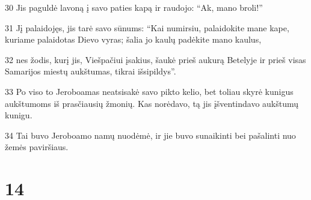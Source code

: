 \par 30 Jis paguldė lavoną į savo paties kapą ir raudojo: “Ak, mano broli!” 
\par 31 Jį palaidojęs, jis tarė savo sūnums: “Kai numirsiu, palaidokite mane kape, kuriame palaidotas Dievo vyras; šalia jo kaulų padėkite mano kaulus, 
\par 32 nes žodis, kurį jis, Viešpačiui įsakius, šaukė prieš aukurą Betelyje ir prieš visas Samarijos miestų aukštumas, tikrai išsipildys”. 
\par 33 Po viso to Jeroboamas neatsisakė savo pikto kelio, bet toliau skyrė kunigus aukštumoms iš prasčiausių žmonių. Kas norėdavo, tą jis įšventindavo aukštumų kunigu. 
\par 34 Tai buvo Jeroboamo namų nuodėmė, ir jie buvo sunaikinti bei pašalinti nuo žemės paviršiaus.



\chapter{14}

